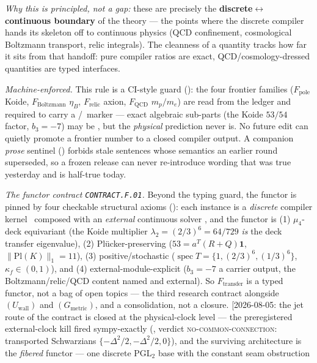 \documentclass[11pt,a4paper]{article}
\begin{document}
\begin{gapbox}
\smallskip
\noindent\emph{Why this is principled, not a gap:} these are precisely the \textbf{discrete$\leftrightarrow$
continuous boundary} of the theory --- the points where the discrete compiler hands its skeleton off to
continuous physics (QCD confinement, cosmological Boltzmann transport, relic integrals). The cleanness of a
quantity tracks how far it sits from that handoff: pure compiler ratios are exact, QCD/cosmology-dressed
quantities are typed interfaces. 
\par\smallskip\noindent\emph{Machine-enforced.} This rule is a CI-style guard
(): the four frontier families
($F_{\mathrm{pole}}$ Koide, $F_{\mathrm{Boltzmann}}$ $\eta_B$, $F_{\mathrm{relic}}$ axion,
$F_{\mathrm{QCD}}$ $m_p/m_e$) are read from the ledger and required to carry a \mC/\mO\ marker --- exact
algebraic sub-parts (the Koide $53/54$ factor, $b_3=-7$) may be \mE, but the \emph{physical} prediction
never is. No future edit can quietly promote a frontier number to a closed compiler output. A companion
\emph{prose} sentinel () forbids stale sentences whose semantics an
earlier round superseded, so a frozen release can never re-introduce wording that was true yesterday and is
half-true today.
\par\smallskip\noindent\emph{The functor contract \texttt{CONTRACT.F.01}.} Beyond the typing guard, the
functor is pinned by four checkable structural axioms (): each instance is a
\emph{discrete} compiler kernel \mE\ composed with an \emph{external} continuous solver \mC, and the functor
is (1) $\mu_4$-deck equivariant (the Koide multiplier $\lambda_2=(2/3)^6=64/729$ \emph{is} the deck transfer
eigenvalue), (2) Pl\"ucker-preserving ($53=a^T(R{+}Q)\mathbf1$, $\|\mathrm{Pl}(K)\|_1=11$), (3)
positive/stochastic ($\operatorname{spec}T=\{1,(2/3)^6,(1/3)^6\}$, $\kappa_f\in(0,1)$), and (4)
external-module-explicit ($b_3=-7$ a carrier output, the Boltzmann/relic/QCD content named and external). So
$F_{\mathrm{transfer}}$ is a typed functor, not a bag of open topics --- the third research contract alongside
$(U_{\mathrm{wall}})$ and $(G_{\mathrm{metric}})$, and a consolidation, not a closure.
[2026-08-05: the jet route of the contract is closed at the physical-clock level --- the preregistered
external-clock kill fired sympy-exactly (, verdict
\textsc{no-common-connection}: transported Schwarzians $\{-\Delta^2/2,-\Delta^2/2,0\}$), and the surviving
architecture is the \emph{fibered} functor --- one discrete PGL$_2$ base with the constant seam obstruction

\end{gapbox}
\end{document}
